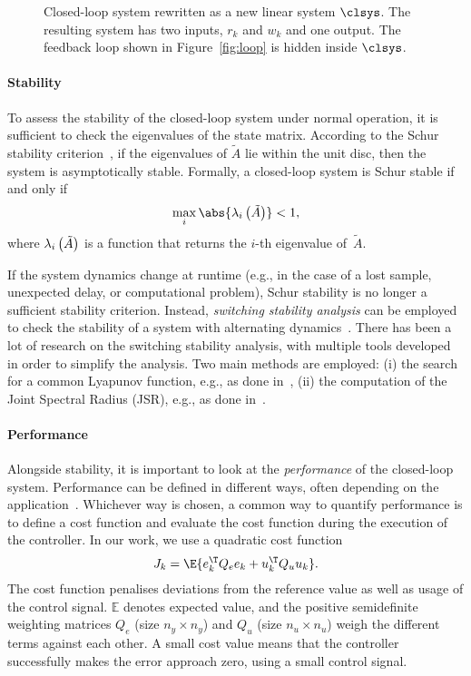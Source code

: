 \begin{figure}[t]
\centering

\caption{Closed-loop system rewritten as a new linear system $\clsys$.
    The resulting system has two inputs, $r_k$ and $w_k$ and one output.
    The feedback loop shown in Figure~\ref{fig:loop} is hidden inside $\clsys$.}
\label{fig:closedloop}
\end{figure}

\paragraph*{Stability}

To assess the stability of the closed-loop system under normal operation, it is sufficient to check the eigenvalues of the state matrix. 
According to the Schur stability criterion~\cite{Astrom:1997}, if the eigenvalues of $\tilde A$ lie within the unit disc, then the system is asymptotically stable. 
Formally, a closed-loop system is Schur stable if and only if
%
\begin{equation}
    \label{eq:schur}
    \max_i{\abs{\eig{i}{\tilde A}}} < 1,
\end{equation}
%
where $\lambda_{i}\left( \tilde A \right)$ is a function that returns the $i$-th eigenvalue of~$\tilde A$.

If the system dynamics change at runtime (e.g., in the case of a lost sample, unexpected delay, or computational problem), Schur stability is no longer a sufficient stability criterion.
Instead, \emph{switching stability analysis} can be employed to check the stability of a system with alternating dynamics~\cite{Jungers2009}.
There has been a lot of research on the switching stability analysis, with multiple tools developed in order to simplify the analysis.
Two main methods are employed: (i) the search for a common Lyapunov function, e.g., as done in~\cite{Linsenmayer:2017}, (ii) the computation of the Joint Spectral Radius (JSR), e.g., as done in~\cite{Maggio:2020,Jungers:2014}.

\paragraph*{Performance}

Alongside stability, it is important to look at the \emph{performance} of the closed-loop system.
Performance can be defined in different ways, often depending on the application~\cite{Astrom:2006}.
Whichever way is chosen, a common way to quantify performance is to define a cost function and evaluate the cost function during the execution of the controller.
In our work, we use a quadratic cost function
%
\begin{equation}
    \label{eq:cost}
    J_k = \E{e_k^\T Q_e e_k + u_k^\T Q_u u_k}.
\end{equation}
%
The cost function penalises deviations from the reference value as well as usage of the control signal.
$\mathbb{E}$ denotes expected value, and the positive semidefinite weighting matrices $Q_e$ (size $n_y \times n_y$) and $Q_u$ (size $n_u \times n_u$) weigh the different terms against each other.
A small cost value means that the controller successfully makes the error approach zero, using a small control signal.

